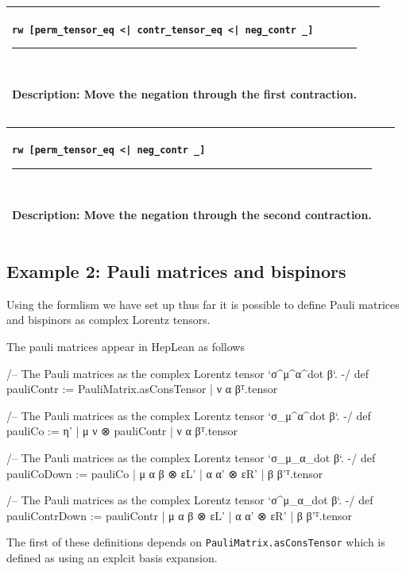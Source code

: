 \documentclass[a4paper, 11pt]{article}
\newcommand{\proofstep}[3]{
  \arrayrulecolor{mycolor}
\begin{center}
\begin{tabular}{|p{3in}| p{3in}|}
\hline
{#1
}\newline 
\hrule~\newline
#2
  & ~\newline
\makebox[3in]{%
#3}
  \\ \hline
\end{tabular}
\end{center}
\arrayrulecolor{black}
}
\begin{document}
\proofstep{\lstinline!rw [perm_tensor_eq <| contr_tensor_eq <| neg_contr _]!}{
  Description: Move the negation through the first contraction.
}{
  \begin{tikzpicture}
    \node[draw=black] (A) at (0,0) {perm};
    \node[draw=black] (B) at (0,-1) {contr 0 0};
    \node[draw=red] (C) at (0,-2) {neg};
    \node[draw=red] (D) at (0,-3) {contr 0 1};
    \node[draw=black] (E) at (0,-4) {prod};
    \node[draw=black] (F1) at (-1,-5) {A};
    \node[draw=black] (F2) at (1,-5) {S};
    \path [->] (A) edge (B);
    \path [->] (B) edge (C);
    \path [->, color = red] (C) edge (D);
    \path [->, color = red] (D) edge (E);
    \path [->] (E) edge (F1);
    \path [->] (E) edge (F2);
  \end{tikzpicture}
}

\proofstep{\lstinline!rw [perm_tensor_eq <| neg_contr _]!}{
  Description: Move the negation through the second contraction.
}{
  \begin{tikzpicture}
    \node[draw=black] (A) at (0,0) {perm};
    \node[draw=red] (B) at (0,-1) {neg};
    \node[draw=red] (C) at (0,-2) {contr 0 0};
    \node[draw=black] (D) at (0,-3) {contr 0 1};
    \node[draw=black] (E) at (0,-4) {prod};
    \node[draw=black] (F1) at (-1,-5) {A};
    \node[draw=black] (F2) at (1,-5) {S};
    \path [->] (A) edge (B);
    \path [->, color = red] (B) edge (C);
    \path [->, color = red] (C) edge (D);
    \path [->] (D) edge (E);
    \path [->] (E) edge (F1);
    \path [->] (E) edge (F2);
  \end{tikzpicture}
}

\subsection{Example 2: Pauli matrices and bispinors}

Using the formlism we have set up thus far it is possible to define Pauli matrices and bispinors 
as complex Lorentz tensors.
 
The pauli matrices appear in HepLean as follows 
\begin{code}
/-- The Pauli matrices as the complex Lorentz tensor `σ^μ^α^{dot β}`. -/
def pauliContr := {PauliMatrix.asConsTensor | ν α β}ᵀ.tensor

/-- The Pauli matrices as the complex Lorentz tensor `σ_μ^α^{dot β}`. -/
def pauliCo := {η' | μ ν ⊗ pauliContr | ν α β}ᵀ.tensor

/-- The Pauli matrices as the complex Lorentz tensor `σ_μ_α_{dot β}`. -/
def pauliCoDown := {pauliCo | μ α β ⊗ εL' | α α' ⊗ εR' | β β'}ᵀ.tensor

/-- The Pauli matrices as the complex Lorentz tensor `σ^μ_α_{dot β}`. -/
def pauliContrDown := {pauliContr | μ α β ⊗ εL' | α α' ⊗ εR' | β β'}ᵀ.tensor
\end{code}
The first of these definitions depends on \lstinline|PauliMatrix.asConsTensor| which is defined as 
using an explcit basis expansion. 
\end{document}
